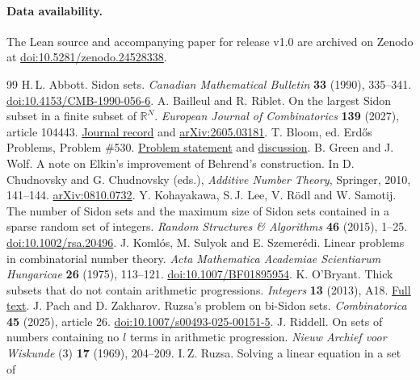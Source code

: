 \documentclass[11pt]{article}
\begin{document}
\paragraph{Data availability.} The Lean source and accompanying paper for release v1.0 are archived on Zenodo at \href{https://doi.org/10.5281/zenodo.24528338}{doi:10.5281/zenodo.24528338}.

\begin{thebibliography}{99}\small\setlength{\itemsep}{1pt}
 H.\,L. Abbott. Sidon sets. \emph{Canadian Mathematical
Bulletin} \textbf{33} (1990), 335--341.
\href{https://doi.org/10.4153/CMB-1990-056-6}{doi:10.4153/CMB-1990-056-6}.
 A. Bailleul and R. Riblet. On the largest Sidon subset in a
finite subset of \(\mathbb R^N\). \emph{European Journal of Combinatorics} \textbf{139} (2027),
article 104443. \href{https://doi.org/10.1016/j.ejc.2026.104443}{Journal record} and
\href{https://arxiv.org/abs/2605.03181}{arXiv:2605.03181}.
 T. Bloom, ed. Erd\H{o}s Problems, Problem \#530.
\href{https://www.erdosproblems.com/530}{Problem statement} and
\href{https://www.erdosproblems.com/forum/thread/530}{discussion}.
 B. Green and J. Wolf. A note on Elkin's improvement of
Behrend's construction. In D. Chudnovsky and G. Chudnovsky (eds.), \emph{Additive Number Theory}, Springer, 2010, 141--144. \href{https://arxiv.org/abs/0810.0732}{arXiv:0810.0732}.
 Y. Kohayakawa, S.\,J. Lee, V. R\"odl and W. Samotij.
The number of Sidon sets and the maximum size of Sidon sets contained in
a sparse random set of integers. \emph{Random Structures \& Algorithms}
\textbf{46} (2015), 1--25. \href{https://doi.org/10.1002/rsa.20496}{doi:10.1002/rsa.20496}.
 J. Koml\'os, M. Sulyok and E. Szemer\'edi.
Linear problems in combinatorial number theory. \emph{Acta Mathematica
Academiae Scientiarum Hungaricae} \textbf{26} (1975), 113--121.
\href{https://doi.org/10.1007/BF01895954}{doi:10.1007/BF01895954}.
 K. O'Bryant. Thick subsets that do not contain
arithmetic progressions. \emph{Integers} \textbf{13} (2013), A18.
\href{https://math.colgate.edu/~integers/n18/n18.pdf}{Full text}.
 J. Pach and D. Zakharov. Ruzsa's problem on bi-Sidon sets.
\emph{Combinatorica} \textbf{45} (2025), article 26.
\href{https://doi.org/10.1007/s00493-025-00151-5}{doi:10.1007/s00493-025-00151-5}.
 J. Riddell. On sets of numbers containing no $l$ terms in arithmetic progression.
\emph{Nieuw Archief voor Wiskunde} (3) \textbf{17} (1969), 204--209.
 I.\,Z. Ruzsa. Solving a linear equation in a set of

\end{thebibliography}
\end{document}
